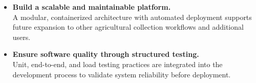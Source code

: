 \begin{itemize}
    \item \textbf{Build a scalable and maintainable platform.} \\A modular, containerized architecture with automated deployment supports future expansion to other agricultural collection workflows and additional users.
    \item \textbf{Ensure software quality through structured testing.} \\Unit, end-to-end, and load testing practices are integrated into the development process to validate system reliability before deployment.
\end{itemize}